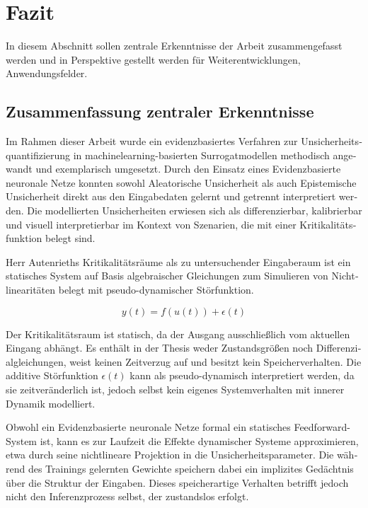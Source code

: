 
\chapter{Fazit}\label{chapter:fazit}



\begin{otherlanguage}{american}
%
%
%
\end{otherlanguage}



\begin{otherlanguage}{ngerman}
In diesem Abschnitt sollen zentrale Erkenntnisse der Arbeit zusammengefasst werden und in Perspektive gestellt werden für Weiterentwicklungen, Anwendungsfelder.

\section{Zusammenfassung zentraler Erkenntnisse}

Im Rahmen dieser Arbeit wurde ein evidenzbasiertes Verfahren zur Unsicherheitsquantifizierung in \gls{machinelearning}-basierten Surrogatmodellen methodisch angewandt und exemplarisch umgesetzt. Durch den Einsatz eines \gls{Evidenzbasierte neuronale Netze} konnten sowohl \gls{Aleatorische Unsicherheit} als auch \gls{Epistemische Unsicherheit} direkt aus den Eingabedaten gelernt und getrennt interpretiert werden. Die modellierten Unsicherheiten erwiesen sich als differenzierbar, kalibrierbar und visuell interpretierbar im Kontext von Szenarien, die mit einer Kritikalitätsfunktion belegt sind.

Herr Autenrieths Kritikalitätsräume als zu untersuchender Eingaberaum ist ein statisches System auf Basis algebraischer Gleichungen zum Simulieren von Nichtlinearitäten belegt mit pseudo-dynamischer Störfunktion. 

\[
y(t) = f(u(t)) + \epsilon(t)
\]

Der Kritikalitätsraum ist statisch, da der Ausgang ausschließlich vom aktuellen Eingang abhängt. Es enthält in der Thesis weder Zustandsgrößen noch Differenzialgleichungen, weist keinen Zeitverzug auf und besitzt kein Speicherverhalten. Die additive Störfunktion $\epsilon(t)$ kann als pseudo-dynamisch interpretiert werden, da sie zeitveränderlich ist, jedoch selbst kein eigenes Systemverhalten mit innerer Dynamik modelliert.

Obwohl ein \gls{Evidenzbasierte neuronale Netze} formal ein statisches Feedforward-System ist, kann es zur Laufzeit die Effekte dynamischer Systeme approximieren, etwa durch seine nichtlineare Projektion in die Unsicherheitsparameter. Die während des Trainings gelernten Gewichte speichern dabei ein implizites Gedächtnis über die Struktur der Eingaben. Dieses speicherartige Verhalten betrifft jedoch nicht den Inferenzprozess selbst, der zustandslos erfolgt.


\end{otherlanguage}
